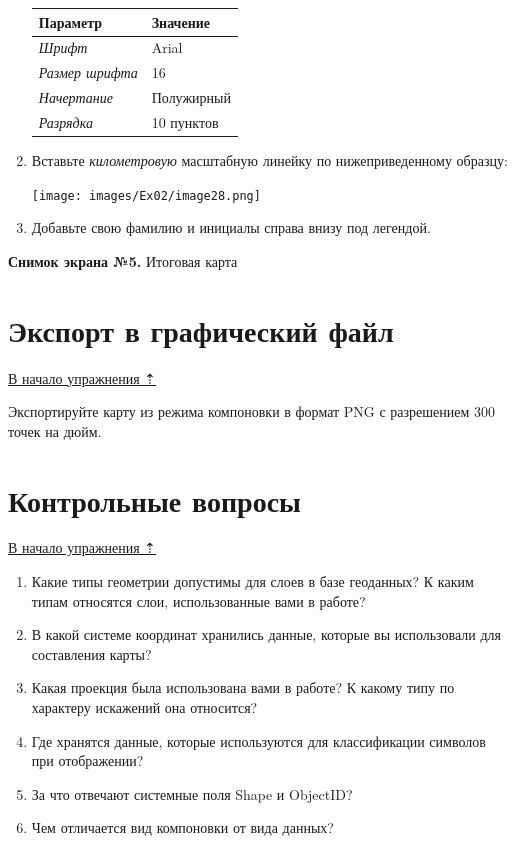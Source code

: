 \documentclass[12pt,]{book}
\begin{document}
\begin{enumerate}
  \begin{longtable}[]{@{}ll@{}}
  \toprule
  Параметр & Значение\tabularnewline
  \midrule
  \endhead
  \emph{Шрифт} & Arial\tabularnewline
  \emph{Размер шрифта} & 16\tabularnewline
  \emph{Начертание} & Полужирный\tabularnewline
  \emph{Разрядка} & 10 пунктов\tabularnewline
  \bottomrule
  \end{longtable}
\item
  Вставьте \emph{километровую} масштабную линейку по нижеприведенному образцу:

  \texttt{[image: images/Ex02/image28.png]}
\item
  Добавьте свою фамилию и инициалы справа внизу под легендой.
\end{enumerate}

\textbf{Снимок экрана №5.} Итоговая карта

\hypertarget{map-design-general-export}{%
\section{Экспорт в графический файл}\label{map-design-general-export}}

\protect\hyperlink{map-design-general}{В начало упражнения ⇡}

Экспортируйте карту из режима компоновки в формат PNG с разрешением 300 точек на дюйм.

\hypertarget{map-design-general-questions}{%
\section{Контрольные вопросы}\label{map-design-general-questions}}

\protect\hyperlink{map-design-general}{В начало упражнения ⇡}

\begin{enumerate}
\def\labelenumi{\arabic{enumi}.}
\item
  Какие типы геометрии допустимы для слоев в базе геоданных? К каким типам относятся слои, использованные вами в работе?
\item
  В какой системе координат хранились данные, которые вы использовали для составления карты?
\item
  Какая проекция была использована вами в работе? К какому типу по характеру искажений она относится?
\item
  Где хранятся данные, которые используются для классификации символов при отображении?
\item
  За что отвечают системные поля Shape и ObjectID?
\item
  Чем отличается вид компоновки от вида данных?
\end{enumerate}
\end{document}
